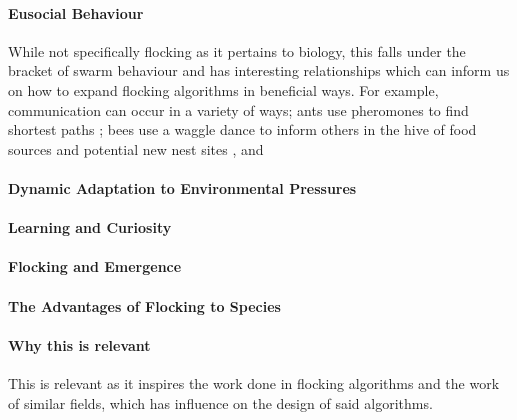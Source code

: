 \paragraph{Eusocial Behaviour}
While not specifically flocking as it pertains to biology, this falls under the bracket of swarm behaviour and has interesting relationships which can inform us on how to expand flocking algorithms in beneficial ways. For example, communication can occur in a variety of ways; ants use pheromones to find shortest paths \citep{DORIGO199773}; bees use a waggle dance to inform others in the hive of food sources and potential new nest sites \citep{AlToufailia2013}, and %
	
\paragraph{Dynamic Adaptation to Environmental Pressures}
	
\paragraph{Learning and Curiosity}

\paragraph{Flocking and Emergence}
	
\paragraph{The Advantages of Flocking to Species} %
	
\paragraph{Why this is relevant}
This is relevant as it inspires the work done in flocking algorithms and the work of similar fields, which has influence on the design of said algorithms. 


